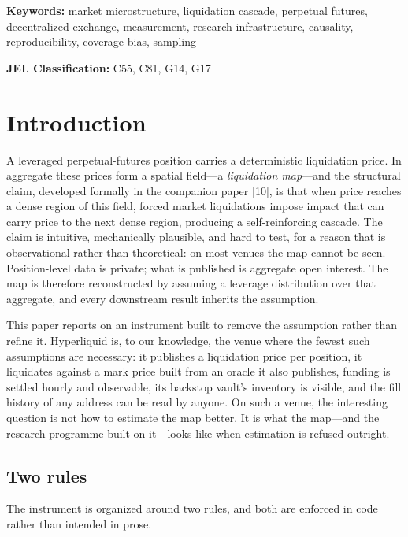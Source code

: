 \documentclass[11pt,a4paper]{article}
\theoremstyle{definition}
\theoremstyle{plain}
\begin{document}
\smallskip
\noindent\textbf{Keywords:} market microstructure, liquidation cascade, perpetual futures,
decentralized exchange, measurement, research infrastructure, causality, reproducibility, coverage
bias, sampling

\smallskip
\noindent\textbf{JEL Classification:} C55, C81, G14, G17

\tableofcontents
\bigskip

\section{Introduction}
\label{sec:intro}

A leveraged perpetual-futures position carries a deterministic liquidation price. In aggregate these
prices form a spatial field---a \emph{liquidation map}---and the structural claim, developed
formally in the companion paper [10], is that when price reaches a dense region of this
field, forced market liquidations impose impact that can carry price to the next dense region,
producing a self-reinforcing cascade. The claim is intuitive, mechanically plausible, and hard to
test, for a reason that is observational rather than theoretical: on most venues the map cannot be
seen. Position-level data is private; what is published is aggregate open interest. The map is
therefore reconstructed by assuming a leverage distribution over that aggregate, and every
downstream result inherits the assumption.

This paper reports on an instrument built to remove the assumption rather than refine it.
Hyperliquid is, to our knowledge, the venue where the fewest such assumptions are necessary: it
publishes a liquidation price per position, it liquidates against a mark price built from an oracle
it also publishes, funding is settled hourly and observable, its backstop vault's inventory is
visible, and the fill history of any address can be read by anyone. On such a venue, the interesting
question is not how to estimate the map better. It is what the map---and the research programme
built on it---looks like when estimation is refused outright.

\subsection{Two rules}

The instrument is organized around two rules, and both are enforced in code rather than intended in
prose.
\end{document}

